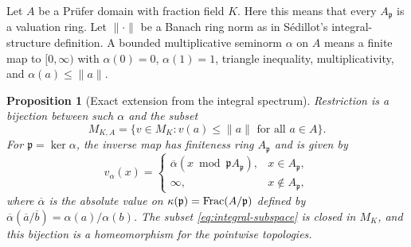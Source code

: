 \documentclass[11pt,a4paper]{article}
\newtheorem{proposition}[theorem]{Proposition}
\theoremstyle{definition}\newtheorem{definition}[theorem]{Definition}
\begin{document}
Let $A$ be a Pr\"ufer domain with fraction field $K$. Here this means that
every $A_{\mathfrak p}$ is a valuation ring. Let $\|\cdot\|$ be a Banach
ring norm as in S\'edillot's integral-structure definition. A bounded
multiplicative seminorm $\alpha$ on $A$ means a finite map to
$[0,\infty)$ with $\alpha(0)=0$, $\alpha(1)=1$, triangle inequality,
multiplicativity, and $\alpha(a)\le\|a\|$.

\begin{proposition}[Exact extension from the integral spectrum]
\label{prop:integral}
Restriction is a bijection between such $\alpha$ and the subset
\[
 M_{K,A}=\{v\in M_K:v(a)\le\|a\|\text{ for all }a\in A\}.
 \tag{AV4.1}\label{eq:integral-subspace}
\]
For $\mathfrak p=\ker\alpha$, the inverse map has finiteness ring
$A_{\mathfrak p}$ and is given by
\[
 v_\alpha(x)=
 \begin{cases}
  \overline\alpha(x\bmod\mathfrak p A_{\mathfrak p}),&x\in A_{\mathfrak p},\\
  \infty,&x\notin A_{\mathfrak p},
 \end{cases}
 \tag{AV4.2}\label{eq:extension}
\]
where $\overline\alpha$ is the absolute value on
$\kappa(\mathfrak p)=\operatorname{Frac}(A/\mathfrak p)$ defined by
$\overline\alpha(\overline a/\overline b)=\alpha(a)/\alpha(b)$.
The subset \eqref{eq:integral-subspace} is closed in $M_K$, and this
bijection is a homeomorphism for the pointwise topologies.
\end{proposition}
\end{document}
